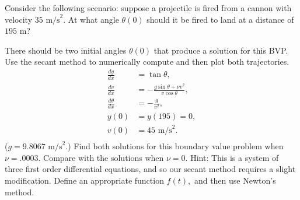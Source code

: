 \pagebreak
\begin{problem}
Consider the following scenario: suppose a projectile is fired from a cannon with velocity $35\text{ m/s}^2.$ At what angle $\theta(0)$ should it be fired to land at a distance of $195\text{ m}$? 

There should be two initial angles $\theta(0)$ that produce a solution for this BVP. Use the secant method to numerically compute and then plot both trajectories.
\begin{align*}
\frac{dy}{dx} &= \tan {\theta} ,\\
\frac{dv}{dx} &= -\frac{g \sin{\theta} + \nu v^2}{v \cos{\theta}},\\
\frac{d\theta}{dx} &= -\frac{g}{v^2},\\
y(0)&= y(195) = 0,\\
v(0) &= 45 \text{ m/s}^2.\\
\end{align*}
($g = 9.8067\text{ m/s}^2.$) Find both solutions for this boundary value problem when $\nu = .0003$. Compare with the solutions when $\nu = 0.$ Hint: This is a system of three first order differential equations, and so our secant method requires a slight modification. Define an appropriate function $f(t),$ and then use Newton's method.
\end{problem}

% 


